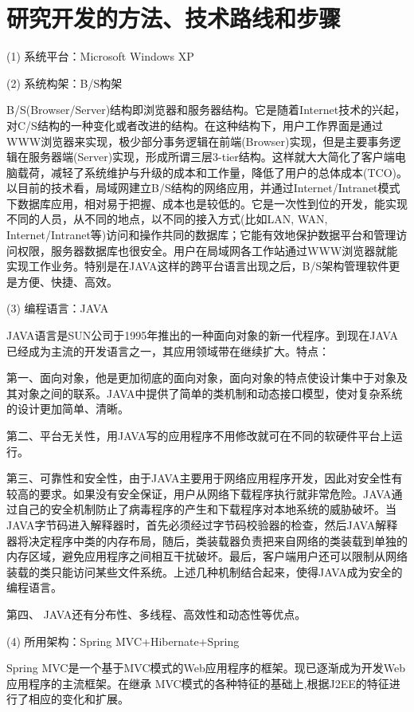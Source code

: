 
\chapter{研究开发的方法、技术路线和步骤}
(1)	系统平台：Microsoft Windows XP

(2)	系统构架：B/S构架\par
B/S(Browser/Server)结构即浏览器和服务器结构。它是随着Internet技术的兴起，对C/S结构的一种变化或者改进的结构。在这种结构下，用户工作界面是通过WWW浏览器来实现，极少部分事务逻辑在前端(Browser)实现，但是主要事务逻辑在服务器端(Server)实现，形成所谓三层3-tier结构。这样就大大简化了客户端电脑载荷，减轻了系统维护与升级的成本和工作量，降低了用户的总体成本(TCO)。以目前的技术看，局域网建立B/S结构的网络应用，并通过Internet/Intranet模式下数据库应用，相对易于把握、成本也是较低的。它是一次性到位的开发，能实现不同的人员，从不同的地点，以不同的接入方式(比如LAN, WAN, Internet/Intranet等)访问和操作共同的数据库；它能有效地保护数据平台和管理访问权限，服务器数据库也很安全。用户在局域网各工作站通过WWW浏览器就能实现工作业务。特别是在JAVA这样的跨平台语言出现之后，B/S架构管理软件更是方便、快捷、高效。

(3)	编程语言：JAVA\par
JAVA语言是SUN公司于1995年推出的一种面向对象的新一代程序。到现在JAVA已经成为主流的开发语言之一，其应用领域带在继续扩大。特点：

{\kai 第一、面向对象，他是更加彻底的面向对象，面向对象的特点使设计集中于对象及其对象之间的联系。JAVA中提供了简单的类机制和动态接口模型，使对复杂系统的设计更加简单、清晰。

第二、平台无关性，用JAVA写的应用程序不用修改就可在不同的软硬件平台上运行。

第三、可靠性和安全性，由于JAVA主要用于网络应用程序开发，因此对安全性有较高的要求。如果没有安全保证，用户从网络下载程序执行就非常危险。JAVA通过自己的安全机制防止了病毒程序的产生和下载程序对本地系统的威胁破坏。当JAVA字节码进入解释器时，首先必须经过字节码校验器的检查，然后JAVA解释器将决定程序中类的内存布局，随后，类装载器负责把来自网络的类装载到单独的内存区域，避免应用程序之间相互干扰破坏。最后，客户端用户还可以限制从网络装载的类只能访问某些文件系统。上述几种机制结合起来，使得JAVA成为安全的编程语言。

第四、	JAVA还有分布性、多线程、高效性和动态性等优点。}

(4)	所用架构：Spring MVC+Hibernate+Spring\par
Spring MVC是一个基于MVC模式的Web应用程序的框架。现已逐渐成为开发Web应用程序的主流框架。在继承 MVC模式的各种特征的基础上,根据J2EE的特征进行了相应的变化和扩展。

